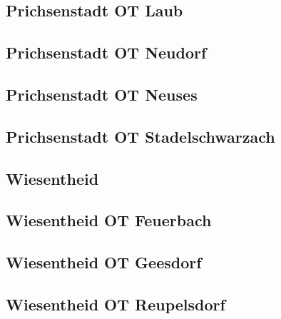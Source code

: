 \documentclass[fontsize=12pt,a4paper]{scrreprt}
\begin{document}
\begin{landscape}
                \subsection{Prichsenstadt OT Laub}
                
                
                \subsection{Prichsenstadt OT Neudorf}
                
                
                \subsection{Prichsenstadt OT Neuses}
                
                
                \subsection{Prichsenstadt OT Stadelschwarzach}
                
                
                \subsection{Wiesentheid}
                
                
                \subsection{Wiesentheid OT Feuerbach}
                
                
                \subsection{Wiesentheid OT Geesdorf}
                
                
                \subsection{Wiesentheid OT Reupelsdorf}
                
                

\end{landscape}
\end{document}
